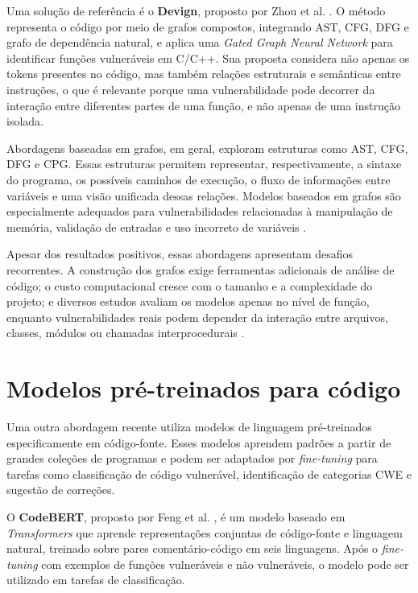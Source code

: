 Uma solução de referência é o \textbf{Devign}, proposto por Zhou et al.
\cite{zhou2019devign}. O método representa o código por meio de grafos
compostos, integrando AST, CFG, DFG e grafo de dependência natural, e
aplica uma \textit{Gated Graph Neural Network} para identificar funções
vulneráveis em C/C++. Sua proposta considera não apenas os tokens
presentes no código, mas também relações estruturais e semânticas entre
instruções, o que é relevante porque uma vulnerabilidade pode decorrer
da interação entre diferentes partes de uma função, e não apenas de uma
instrução isolada.

Abordagens baseadas em grafos, em geral, exploram estruturas como AST,
CFG, DFG e CPG. Essas estruturas permitem representar, respectivamente,
a sintaxe do programa, os possíveis caminhos de execução, o fluxo de
informações entre variáveis e uma visão unificada dessas relações.
Modelos baseados em grafos são especialmente adequados para
vulnerabilidades relacionadas à manipulação de memória, validação de
entradas e uso incorreto de variáveis \cite{chakraborty2021survey,yamaguchi2014cpg}.

Apesar dos resultados positivos, essas abordagens apresentam desafios
recorrentes. A construção dos grafos exige ferramentas adicionais de
análise de código; o custo computacional cresce com o tamanho e a
complexidade do projeto; e diversos estudos avaliam os modelos apenas no
nível de função, enquanto vulnerabilidades reais podem depender da
interação entre arquivos, classes, módulos ou chamadas interprocedurais
\cite{chakraborty2021survey,ding2024primevul}.

\section{Modelos pré-treinados para código}
\label{sec:modelos_pre_treinados}

Uma outra abordagem recente utiliza modelos de linguagem pré-treinados
especificamente em código-fonte. Esses modelos aprendem padrões a partir
de grandes coleções de programas e podem ser adaptados por
\textit{fine-tuning} para tarefas como classificação de código
vulnerável, identificação de categorias CWE e sugestão de correções.

O \textbf{CodeBERT}, proposto por Feng et al. \cite{feng2020codebert}, é
um modelo baseado em \textit{Transformers} que aprende representações
conjuntas de código-fonte e linguagem natural, treinado sobre pares
comentário-código em seis linguagens. Após o \textit{fine-tuning} com
exemplos de funções vulneráveis e não vulneráveis, o modelo pode ser
utilizado em tarefas de classificação.

